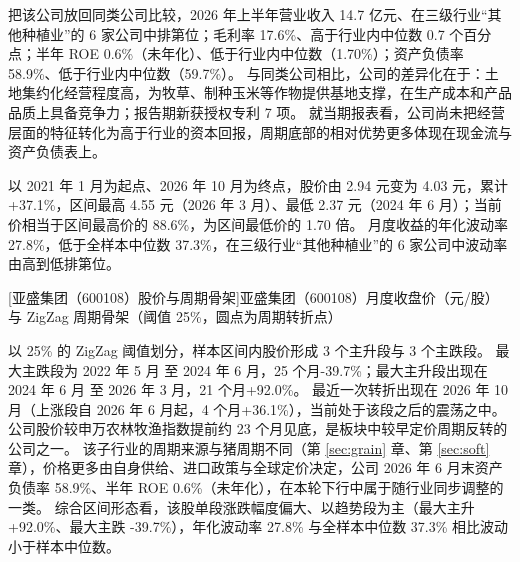  把该公司放回同类公司比较，2026 年上半年营业收入 14.7 亿元、在三级行业“其他种植业”的 6 家公司中排第位；毛利率 17.6\%、高于行业内中位数 0.7 个百分点；半年 ROE 0.6\%（未年化）、低于行业内中位数（1.70\%）；资产负债率 58.9\%、低于行业内中位数（59.7\%）。 与同类公司相比，公司的差异化在于：土地集约化经营程度高，为牧草、制种玉米等作物提供基地支撑，在生产成本和产品品质上具备竞争力；报告期新获授权专利 7 项。 就当期报表看，公司尚未把经营层面的特征转化为高于行业的资本回报，周期底部的相对优势更多体现在现金流与资产负债表上。

 以 2021 年 1 月为起点、2026 年 10 月为终点，股价由 2.94 元变为 4.03 元，累计 +37.1\%，区间最高 4.55 元（2026 年 3 月）、最低 2.37 元（2024 年 6 月）；当前价相当于区间最高价的 88.6\%，为区间最低价的 1.70 倍。 月度收益的年化波动率 27.8\%，低于全样本中位数 37.3\%，在三级行业“其他种植业”的 6 家公司中波动率由高到低排第位。

\begin{center}
\begin{minipage}{\textwidth}\centering
{}

[亚盛集团（600108）股价与周期骨架]{亚盛集团（600108）月度收盘价（元/股）与 ZigZag 周期骨架（阈值 25\%，圆点为周期转折点）}
\end{minipage}
\end{center}

 以 25\% 的 ZigZag 阈值划分，样本区间内股价形成 3 个主升段与 3 个主跌段。 最大主跌段为 2022 年 5 月 至 2024 年 6 月，25 个月-39.7\%；最大主升段出现在 2024 年 6 月 至 2026 年 3 月，21 个月+92.0\%。 最近一次转折出现在 2026 年 10 月（上涨段自 2026 年 6 月起，4 个月+36.1\%），当前处于该段之后的震荡之中。 公司股价较申万农林牧渔指数提前约 23 个月见底，是板块中较早定价周期反转的公司之一。 该子行业的周期来源与猪周期不同（第 \ref{sec:grain} 章、第 \ref{sec:soft} 章），价格更多由自身供给、进口政策与全球定价决定，公司 2026 年 6 月末资产负债率 58.9\%、半年 ROE 0.6\%（未年化），在本轮下行中属于随行业同步调整的一类。 综合区间形态看，该股单段涨跌幅度偏大、以趋势段为主（最大主升 +92.0\%、最大主跌 -39.7\%），年化波动率 27.8\% 与全样本中位数 37.3\% 相比波动小于样本中位数。

